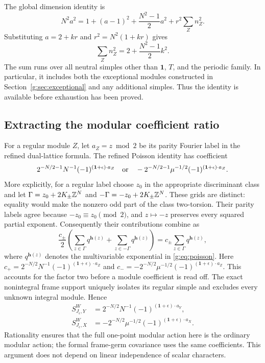 \documentclass[11pt,a4paper]{article}
\numberwithin{equation}{section}
\theoremstyle{definition}\newtheorem{definition}[theorem]{Definition}
\theoremstyle{remark}\newtheorem{remark}[theorem]{Remark}
\newcommand{\one}{\mathbf1}\newcommand{\B}{\mathcal B}\newcommand{\W}{W_N}
\begin{document}
The global dimension identity is
\[
 N^2a^2
 =1+(a-1)^2+\frac{N^2-1}{2}a^2+r^2\sum_Zn_Z^2.
\]
Substituting \(a=2+kr\) and \(r^2=N^2(1+kr)\) gives
\begin{equation}\label{r:eq:budget}
                \boxed{\sum_Zn_Z^2
                    =2+\frac{N^2-1}{2}k^2.}
\end{equation}
The sum runs over all neutral simples other than $\mathbf1$, $T$,
and the periodic family. In particular, it includes both the
exceptional modules constructed in Section~\ref{g:sec:exceptional}
and any additional simples. Thus the identity is available before
exhaustion has been proved.

\subsection{Extracting the modular coefficient ratio}

For a regular module \(Z\), let \(a_Z=z\bmod2\) be its parity Fourier
label in the refined dual-lattice formula. The refined
Poisson identity has coefficient
\[
 2^{-N/2-1}N^{-1}(-1)^{(\one+\epsilon)\cdot a_Z}
 \quad\hbox{or}\quad
 -2^{-N/2-1}\mu^{-1/2}(-1)^{(\one+\epsilon)\cdot a_Z}.
\]
More explicitly, for a regular label choose $z_0$ in the
appropriate discriminant class and let
$\Gamma=z_0+2K_\pm\mathbb Z^N$ and $-\Gamma=-z_0+2K_\pm\mathbb Z^N$.
These grids are distinct: equality would make the nonzero odd
part of the class two-torsion. Their parity labels agree because
$-z_0\equiv z_0\pmod2$, and $z\mapsto-z$ preserves every squared
partial exponent. Consequently their contributions combine as
\[
 \frac{c_\pm}{2}
 \left(\sum_{z\in\Gamma}q^{\mathbf h(z)}
       +\sum_{z\in-\Gamma}q^{\mathbf h(z)}\right)
 =c_\pm\sum_{z\in\Gamma}q^{\mathbf h(z)},
\]
where $q^{\mathbf h(z)}$ denotes the multivariable exponential in
\eqref{g:eq:poisson}. Here
$c_+=2^{-N/2}N^{-1}(-1)^{(\one+\epsilon)\cdot a_Z}$ and
$c_-=-2^{-N/2}\mu^{-1/2}(-1)^{(\one+\epsilon)\cdot a_Z}$.
This accounts for the factor two before a module coefficient is
read off.
The exact nonintegral frame support uniquely isolates its regular
simple and excludes every unknown integral module. Hence
\begin{align}
 S^W_{J_\epsilon,Y}
    &=2^{-N/2}N^{-1}(-1)^{(\one+\epsilon)\cdot a_Y},\label{r:eq:SY}\\
 S^W_{J_\epsilon,X}
    &=-2^{-N/2}\mu^{-1/2}(-1)^{(\one+\epsilon)\cdot a_X}.
       \label{r:eq:SX}
\end{align}
Rationality ensures that the full one-point modular action here
is the ordinary modular action; the formal frame-germ covariance
uses the same coefficients. This argument does not depend on
linear independence of scalar characters.
\end{document}
